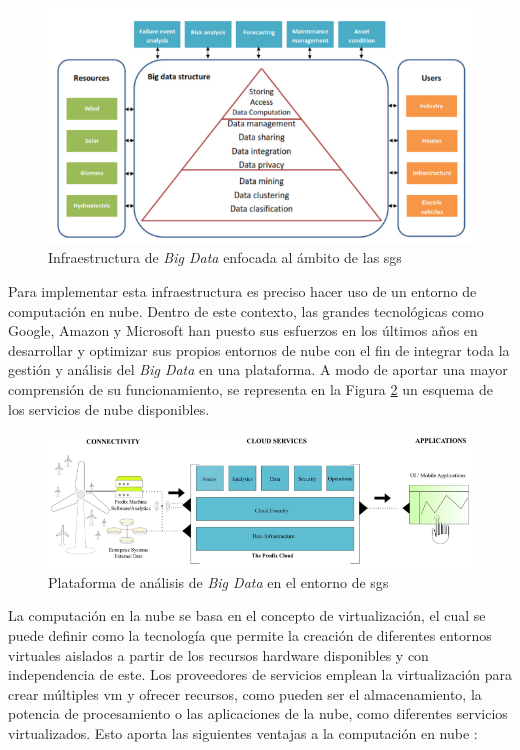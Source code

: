 \begin{figure}[h!]
  \centering
  \includegraphics[width=1\textwidth]{img/teoria/bigdata2.png}
  \caption{Infraestructura de \textit{Big Data} enfocada al ámbito de las \acrshort{sg}s \cite{stab}}
  \label{fig:bigdata2}
\end{figure}

Para implementar esta infraestructura es preciso hacer uso de un entorno de computación en nube. Dentro de este contexto, las grandes tecnológicas como Google, Amazon y Microsoft han puesto sus esfuerzos en los últimos años en desarrollar y optimizar sus propios entornos de nube con el fin de integrar toda la gestión y análisis del \textit{Big Data} en una plataforma. A modo de aportar una mayor comprensión de su funcionamiento, se representa en la Figura \ref{fig:bigdata} un esquema de los servicios de nube disponibles.

\begin{figure}[h!]
  \centering
  \includegraphics[width=1\textwidth]{img/teoria/bigdata.png}
  \caption{Plataforma de análisis de \textit{Big Data} en el entorno de \acrshort{sg}s \cite{bigdata}}
  \label{fig:bigdata}
\end{figure}

\vspace{3mm}

La computación en la nube se basa en el concepto de virtualización, el cual se puede definir como la tecnología que permite la creación de diferentes entornos virtuales aislados a partir de los recursos hardware disponibles y con independencia de este. Los proveedores de servicios emplean la virtualización para crear múltiples \gls{vm} y ofrecer recursos, como pueden ser el almacenamiento, la potencia de procesamiento o las aplicaciones de la nube, como diferentes servicios virtualizados. Esto aporta las siguientes ventajas a la computación en nube \cite{bigdata} \cite{virt}:


